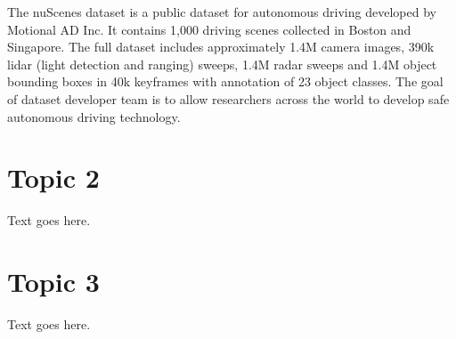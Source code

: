 The nuScenes dataset is a public dataset for autonomous driving developed by Motional AD Inc. It contains 1,000 driving scenes collected in Boston and Singapore. The full dataset includes approximately 1.4M camera images, 390k lidar (light detection and ranging) sweeps, 1.4M radar sweeps and 1.4M object bounding boxes in 40k keyframes with annotation of 23 object classes. The goal of dataset developer team is to allow researchers across the world to develop safe autonomous driving technology. \cite{nuscenes2019}

\section{Topic 2}

Text goes here.

\section{Topic 3}

Text goes here.

